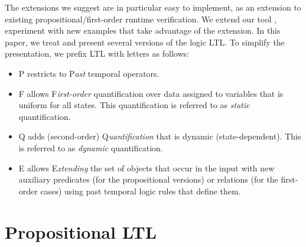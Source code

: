 The extensions we suggest are in particular easy to implement, as an extension to existing propositional/first-order runtime verification. We extend our tool \dejavu, experiment with new examples that take advantage of the extension.
\fi
\vspace{1ex}
\label{sec:prelim}
In this paper, we treat and present several versions of the logic LTL. To simplify
the presentation, we prefix LTL with letters as follows:

\begin{itemize}
\item{P} restricts to P{\em ast} temporal operators.
\item{F} allows F{\em irst-order} quantification over
data assigned to variables that is uniform for all states. This quantification is referred to as {\em static} quantification.
\item{Q} adds (second-order) Q{\em uantification} that is dynamic (state-dependent). This is referred to as {\em dynamic} quantification.
\item{E} allows E{\em xtending} the 
set of objects that occur in the input with
new auxiliary predicates (for the propositional versions) or relations (for the first-order cases) using past temporal logic rules that define them.
\end{itemize}







\newcommand\eventty{\mathbb{E}}
\newcommand\setof[1]{\mathcal{P}(#1)}


\section{Propositional LTL}
\label{propLTL}

